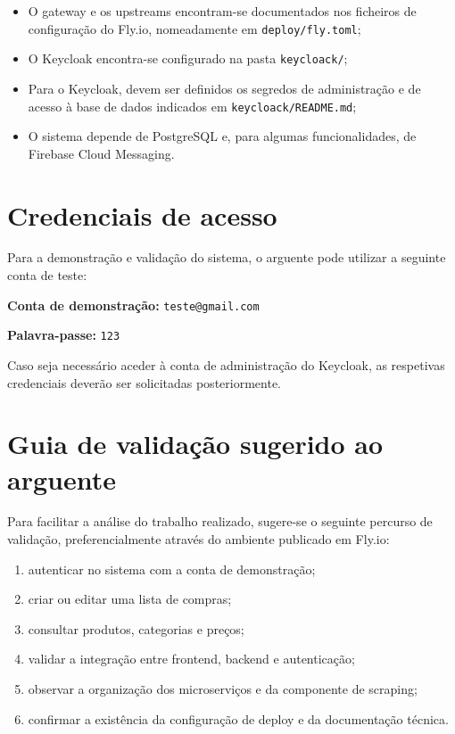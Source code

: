 \documentclass[a4paper,11pt]{article}
\let\oldsection\section
\renewcommand{\section}{\Needspace{8\baselineskip}\oldsection}
\begin{document}
\begin{itemize}[leftmargin=1.8em]
    \item O gateway e os upstreams encontram-se documentados nos ficheiros de configura\c{c}\~ao do Fly.io, nomeadamente em \texttt{deploy/fly.toml};
    \item O Keycloak encontra-se configurado na pasta \texttt{keycloack/};
    \item Para o Keycloak, devem ser definidos os segredos de administra\c{c}\~ao e de acesso \`a base de dados indicados em \texttt{keycloack/README.md};
    \item O sistema depende de PostgreSQL e, para algumas funcionalidades, de Firebase Cloud Messaging.
\end{itemize}

\section{Credenciais de acesso}

Para a demonstra\c{c}\~ao e valida\c{c}\~ao do sistema, o arguente pode utilizar a seguinte conta de teste:

\textbf{Conta de demonstra\c{c}\~ao:} \texttt{teste@gmail.com}

\textbf{Palavra-passe:} \texttt{123}

Caso seja necess\'ario aceder \`a conta de administra\c{c}\~ao do Keycloak, as respetivas credenciais dever\~ao ser solicitadas posteriormente.

\section{Guia de valida\c{c}\~ao sugerido ao arguente}

Para facilitar a an\'alise do trabalho realizado, sugere-se o seguinte percurso de valida\c{c}\~ao, preferencialmente atrav\'es do ambiente publicado em Fly.io:

\begin{enumerate}[leftmargin=1.8em]
    \item autenticar no sistema com a conta de demonstra\c{c}\~ao;
    \item criar ou editar uma lista de compras;
    \item consultar produtos, categorias e pre\c{c}os;
    \item validar a integra\c{c}\~ao entre frontend, backend e autentica\c{c}\~ao;
    \item observar a organiza\c{c}\~ao dos microservi\c{c}os e da componente de scraping;
    \item confirmar a exist\^encia da configura\c{c}\~ao de deploy e da documenta\c{c}\~ao t\'ecnica.
\end{enumerate}
\end{document}
